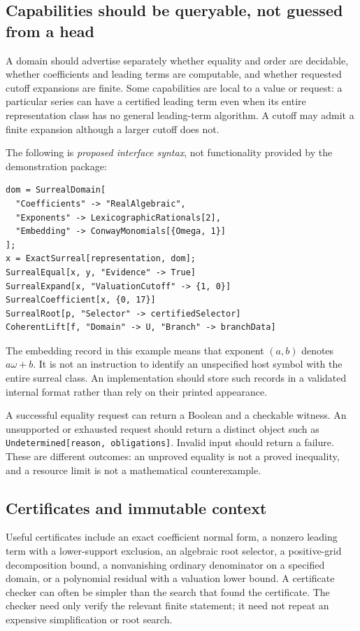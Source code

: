 \documentclass[11pt,letterpaper]{article}
\numberwithin{equation}{section}
\theoremstyle{definition}
\theoremstyle{remark}\newtheorem{remark}[theorem]{Remark}
\begin{document}
\subsection{Capabilities should be queryable, not guessed from a head}
A domain should advertise separately whether equality and order are
decidable, whether coefficients and leading terms are computable, and
whether requested cutoff expansions are finite. Some capabilities
are local to a value or request: a particular series can have a certified
leading term even when its entire representation class has no general
leading-term algorithm. A cutoff may admit a finite expansion although a
larger cutoff does not.

The following is \emph{proposed interface syntax}, not functionality provided
by the demonstration package:
\begin{lstlisting}
dom = SurrealDomain[
  "Coefficients" -> "RealAlgebraic",
  "Exponents" -> LexicographicRationals[2],
  "Embedding" -> ConwayMonomials[{Omega, 1}]
];
x = ExactSurreal[representation, dom];
SurrealEqual[x, y, "Evidence" -> True]
SurrealExpand[x, "ValuationCutoff" -> {1, 0}]
SurrealCoefficient[x, {0, 17}]
SurrealRoot[p, "Selector" -> certifiedSelector]
CoherentLift[f, "Domain" -> U, "Branch" -> branchData]
\end{lstlisting}
The embedding record in this example means that exponent $(a,b)$ denotes
$a\omega+b$. It is not an instruction to identify an unspecified host
symbol with the entire surreal class. An implementation should store such
records in a validated internal format rather than rely on their printed
appearance.

A successful equality request can return a Boolean and a checkable witness.
An unsupported or exhausted request should return a distinct object such as
\texttt{Undetermined[reason, obligations]}. Invalid input should return a
failure. These are different outcomes: an unproved equality is not a proved
inequality, and a resource limit is not a mathematical counterexample.

\subsection{Certificates and immutable context}
Useful certificates include an exact coefficient normal form, a nonzero
leading term with a lower-support exclusion, an algebraic root selector, a
positive-grid decomposition bound, a nonvanishing ordinary denominator on a
specified domain, or a polynomial residual with a valuation lower bound.
A certificate checker can often be simpler than the search that found the
certificate. The checker need only verify the relevant finite statement;
it need not repeat an expensive simplification or root search.
\end{document}
